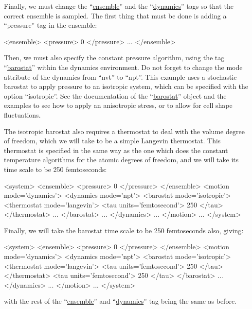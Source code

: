 \documentclass[11pt,english,fleqn]{report}
\newenvironment{code}{%
\footnotesize
\verbatim
}{
\endverbatim
\normalsize
}
\begin{document}
Finally, we must change the {}``\hyperref[ENSEMBLE]{ensemble}''
and the {}``\hyperref[DYNAMICS]{dynamics}'' tags so that the correct
ensemble is sampled. The first thing that must be done is
adding a {}``pressure'' tag in the ensemble:

\begin{code}
<ensemble>
   <pressure> 0 </pressure>
   ...
</ensemble>
\end{code}

Then, we must also specify the constant pressure algorithm,
using the tag {}``\hyperref[BAROSTAT]{barostat}'' within the dynamics
environment. Do not forget to change the mode attribute of the
dynamics from ``nvt'' to ``npt''.
This example uses a stochastic barostat to apply pressure
to an isotropic system, which can be specified with the option ``isotropic''.
See the documentation of the {}``\hyperref[BAROSTAT]{barostat}'' object
and the examples to see how to apply an anisotropic stress, or to allow
for cell shape fluctuations.

The isotropic barostat also requires a thermostat
to deal with the volume degree of freedom, which we will take
to be a simple Langevin thermostat.
This thermostat is specified in the same way as the one which does the
constant temperature algorithms for the atomic degrees of freedom, and
we will take its time scale to be 250 femtoseconds:

\begin{code}
<system>
   <ensemble>
      <pressure> 0 </pressure>
   </ensemble>
   <motion mode='dynamics'>
      <dynamics mode='npt'>
         <barostat mode='isotropic'>
            <thermostat mode='langevin'>
               <tau units='femtosecond'> 250 </tau>
            </thermostat>
            ...
         </barostat>
         ...
      </dynamics>
      ...
   </motion>
   ...
</system>
\end{code}

Finally, we will take the barostat time scale to be 250 femtoseconds also, giving:

\begin{code}
<system>
   <ensemble>
      <pressure> 0 </pressure>
   </ensemble>
   <motion mode='dynamics'>
      <dynamics mode='npt'>
         <barostat mode='isotropic'>
            <thermostat mode='langevin'>
               <tau units='femtosecond'> 250 </tau>
            </thermostat>
            <tau units='femtosecond'> 250 </tau>
         </barostat>
         ...
      </dynamics>
      ...
   </motion>
   ...
</system>
\end{code}
with the rest of the {}``\hyperref[ENSEMBLE]{ensemble}'' and
{}``\hyperref[DYNAMICS]{dynamics}'' tag being the same as before.
\end{document}
